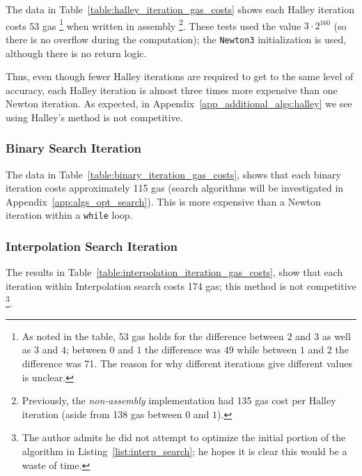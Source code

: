 The data in Table~\ref{table:halley_iteration_gas_costs}
shows each Halley iteration costs 53 gas%
\footnote{As noted in the table, 53 gas holds for the difference
between $2$ and $3$ as well as $3$ and $4$;
between $0$ and $1$ the difference was 49 while between $1$ and $2$
the difference was 71.
The reason for why different iterations give different values is unclear.}
when written in assembly%
\footnote{Previously, the \emph{non-assembly} implementation had 135 gas cost
per Halley iteration (aside from 138 gas between $0$ and $1$).}.
These tests used the value $3\cdot2^{160}$
(so there is no overflow during the computation);
the \texttt{Newton3} initialization is used,
although there is no return logic.

Thus, even though fewer Halley iterations are required
to get to the same level of accuracy,
each Halley iteration is almost three times more expensive
than one Newton iteration.
As expected, in Appendix~\ref{app_additional_algs:halley}
we see using Halley's method is not competitive.

\subsubsection{Binary Search Iteration}
\label{app_gas_costs:binary_search}

The data in Table~\ref{table:binary_iteration_gas_costs},
shows that each binary iteration costs approximately 115 gas
(search algorithms will be investigated in
Appendix~\ref{app:algs_opt_search}).
This is more expensive than a Newton iteration within a \texttt{while} loop.

\subsubsection{Interpolation Search Iteration}
\label{app_gas_costs:interpolation_search}

The results in Table~\ref{table:interpolation_iteration_gas_costs},
show that each iteration within Interpolation search costs 174 gas;
this method is not competitive%
\footnote{The author admits he did not attempt to optimize
the initial portion of the algorithm in Listing~\ref{list:interp_search};
he hopes it is clear this would be a waste of time.}.
